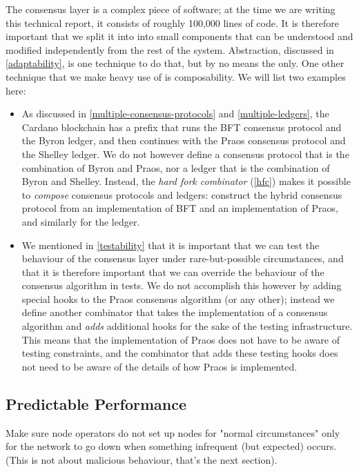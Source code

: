 The consensus layer is a complex piece of software;  at the time we are writing
this technical report, it consists of roughly 100,000 lines of code. It is
therefore important that we split it into into small components that can be
understood and modified independently from the rest of the system. Abstraction,
discussed in \cref{adaptability}, is one technique to do that, but by no means
the only. One other technique that we make heavy use of is composability. We
will list two examples here:

\begin{itemize}
\item As discussed in \cref{multiple-consensus-protocols} and
\cref{multiple-ledgers}, the Cardano blockchain has a prefix that runs the BFT
consensus protocol and the Byron ledger, and then continues with the Praos
consensus protocol and the Shelley ledger. We do not however define a consensus
protocol that is the combination of Byron and Praos, nor a ledger that is the
combination of Byron and Shelley. Instead, the \emph{hard fork combinator}
(\cref{hfc}) makes it possible to \emph{compose} consensus protocols and
ledgers: construct the hybrid consensus protocol from an implementation of BFT
and an implementation of Praos, and similarly for the ledger.

\item We mentioned in \cref{testability} that it is important that we can
test the behaviour of the consensus layer under rare-but-possible circumstances,
and that it is therefore important that we can override the behaviour of the
consensus algorithm in tests. We do not accomplish this however by adding
special hooks to the Praos consensus algorithm (or any other); instead we define
another combinator that takes the implementation of a consensus algorithm and
\emph{adds} additional hooks for the sake of the testing infrastructure. This
means that the implementation of Praos does not have to be aware of testing
constraints, and the combinator that adds these testing hooks does not need to
be aware of the details of how Praos is implemented.
\end{itemize}

\subsection{Predictable Performance}

Make sure node operators do not set up nodes for "normal circumstances" only
for the network to go down when something infrequent (but expected) occurs.
(This is not about malicious behaviour, that's the next section).


